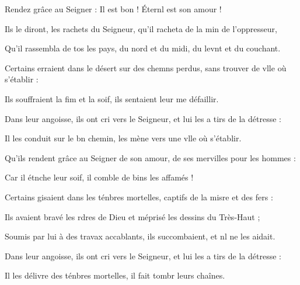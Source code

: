 \item Rendez grâce au Seigner : Il est bon !\psstar{} Éternl est son amour !
\item Ils le diront, les rachets du Seigneur,\psstar{} qu’il racheta de la min de l’oppresseur,
\item Qu’il rassembla de tos les pays,\psstar{} du nord et du midi, du levnt et du couchant.
\item Certains erraient dans le désert sur des chemns perdus,\psstar{} sans trouver de vlle où s’établir :
\item Ils souffraient la fim et la soif,\psstar{} ils sentaient leur me défaillir.
\item Dans leur angoisse, ils ont cri vers le Seigneur,\psstar{} et lui les a tirs de la détresse :
\item Il les conduit sur le bn chemin,\psstar{} les mène vers une vlle où s’établir.
\item Qu’ils rendent grâce au Seigner de son amour,\psstar{} de ses mervilles pour les hommes :
\item Car il étnche leur soif,\psstar{} il comble de bins les affamés !
\item Certains gisaient dans les ténbres mortelles,\psstar{} captifs de la misre et des fers :
\item Ils avaient bravé les rdres de Dieu\psstar{} et méprisé les dessins du Très-Haut ;
\item Soumis par lui à des travax accablants,\psstar{} ils succombaient, et nl ne les aidait.
\item Dans leur angoisse, ils ont cri vers le Seigneur,\psstar{} et lui les a tirs de la détresse :
\item Il les délivre des ténbres mortelles,\psstar{} il fait tombr leurs chaînes.